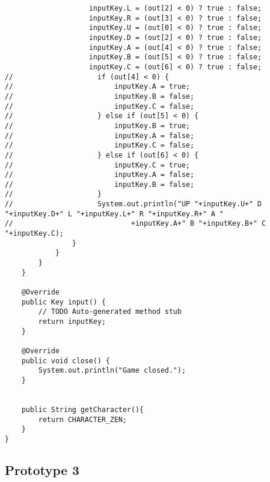 \documentclass[12pt,a4paper]{article}
\begin{document}
\begin{lstlisting}
                    inputKey.L = (out[2] < 0) ? true : false;
                    inputKey.R = (out[3] < 0) ? true : false;
                    inputKey.U = (out[0] < 0) ? true : false;
                    inputKey.D = (out[2] < 0) ? true : false;
                    inputKey.A = (out[4] < 0) ? true : false;
                    inputKey.B = (out[5] < 0) ? true : false;
                    inputKey.C = (out[6] < 0) ? true : false;
//                    if (out[4] < 0) {
//                        inputKey.A = true;
//                        inputKey.B = false;
//                        inputKey.C = false;
//                    } else if (out[5] < 0) {
//                        inputKey.B = true;
//                        inputKey.A = false;
//                        inputKey.C = false;
//                    } else if (out[6] < 0) {
//                        inputKey.C = true;
//                        inputKey.A = false;
//                        inputKey.B = false;
//                    }
//                    System.out.println("UP "+inputKey.U+" D "+inputKey.D+" L "+inputKey.L+" R "+inputKey.R+" A "
//                            +inputKey.A+" B "+inputKey.B+" C "+inputKey.C);
                }
            }
        }
    }

    @Override
    public Key input() {
        // TODO Auto-generated method stub
        return inputKey;
    }

    @Override
    public void close() {
        System.out.println("Game closed.");
    }


    public String getCharacter(){
        return CHARACTER_ZEN;
    }
}
\end{lstlisting}
\newpage
\subsection{Prototype 3}
\end{document}
